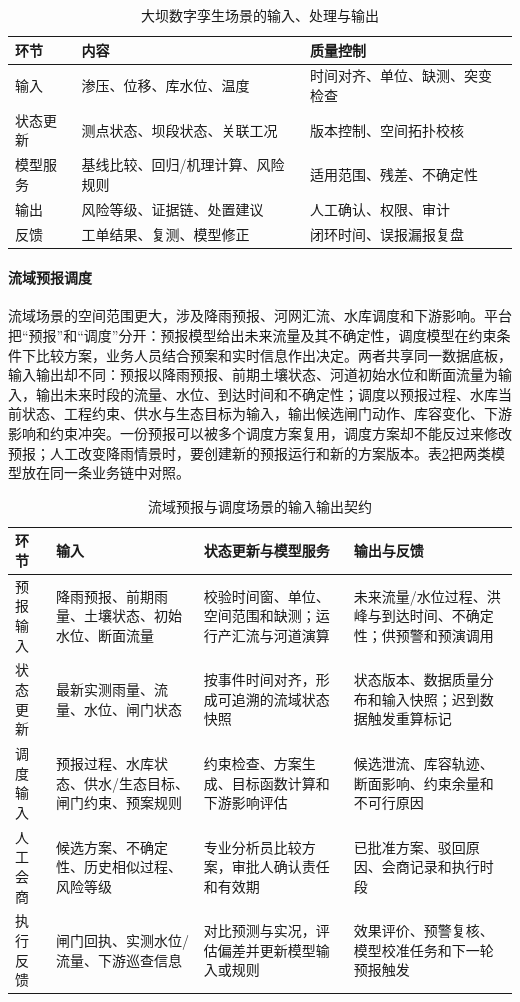 \begin{table}[htbp]
\centering
\caption{大坝数字孪生场景的输入、处理与输出}
\label{tab:dam-twin-scenario}
\begin{tabular}{p{3.1cm}p{4.5cm}p{5.2cm}}
\toprule
环节 & 内容 & 质量控制 \\
\midrule
输入 & 渗压、位移、库水位、温度 & 时间对齐、单位、缺测、突变检查 \\
状态更新 & 测点状态、坝段状态、关联工况 & 版本控制、空间拓扑校核 \\
模型服务 & 基线比较、回归/机理计算、风险规则 & 适用范围、残差、不确定性 \\
输出 & 风险等级、证据链、处置建议 & 人工确认、权限、审计 \\
反馈 & 工单结果、复测、模型修正 & 闭环时间、误报漏报复盘 \\
\bottomrule
\end{tabular}
\end{table}

\paragraph{流域预报调度}流域场景的空间范围更大，涉及降雨预报、河网汇流、水库调度和下游影响。平台把“预报”和“调度”分开：预报模型给出未来流量及其不确定性，调度模型在约束条件下比较方案，业务人员结合预案和实时信息作出决定。两者共享同一数据底板，输入输出却不同：预报以降雨预报、前期土壤状态、河道初始水位和断面流量为输入，输出未来时段的流量、水位、到达时间和不确定性；调度以预报过程、水库当前状态、工程约束、供水与生态目标为输入，输出候选闸门动作、库容变化、下游影响和约束冲突。一份预报可以被多个调度方案复用，调度方案却不能反过来修改预报；人工改变降雨情景时，要创建新的预报运行和新的方案版本。表\ref{tab:basin-forecast-dispatch}把两类模型放在同一条业务链中对照。

\begin{table}[htbp]
\centering
\caption{流域预报与调度场景的输入输出契约}
\label{tab:basin-forecast-dispatch}
\begin{tabular}{p{2.2cm}p{3.4cm}p{3.7cm}p{3.7cm}}
\toprule
环节 & 输入 & 状态更新与模型服务 & 输出与反馈 \\
\midrule
预报输入 & 降雨预报、前期雨量、土壤状态、初始水位、断面流量 & 校验时间窗、单位、空间范围和缺测；运行产汇流与河道演算 & 未来流量/水位过程、洪峰与到达时间、不确定性；供预警和预演调用 \\
状态更新 & 最新实测雨量、流量、水位、闸门状态 & 按事件时间对齐，形成可追溯的流域状态快照 & 状态版本、数据质量分布和输入快照；迟到数据触发重算标记 \\
调度输入 & 预报过程、水库状态、供水/生态目标、闸门约束、预案规则 & 约束检查、方案生成、目标函数计算和下游影响评估 & 候选泄流、库容轨迹、断面影响、约束余量和不可行原因 \\
人工会商 & 候选方案、不确定性、历史相似过程、风险等级 & 专业分析员比较方案，审批人确认责任和有效期 & 已批准方案、驳回原因、会商记录和执行时段 \\
执行反馈 & 闸门回执、实测水位/流量、下游巡查信息 & 对比预测与实况，评估偏差并更新模型输入或规则 & 效果评价、预警复核、模型校准任务和下一轮预报触发 \\
\bottomrule
\end{tabular}
\end{table}

